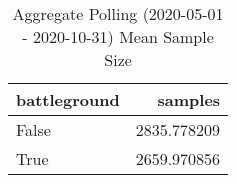 \begin{table}
\centering
\caption{Aggregate Polling (2020-05-01 - 2020-10-31) Mean Sample Size}
\label{table:aggregate\_polling\_2020-05-01\_-\_2020-10-31\_mean\_sample\_size}
\begin{tabular}{lr}
\toprule
 battleground &      samples \\
\midrule
        False &  2835.778209 \\
         True &  2659.970856 \\
\bottomrule
\end{tabular}
\end{table}
